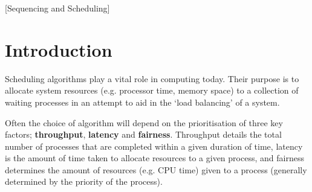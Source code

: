 \documentclass{acm_proc_article-sp}
\begin{document}

\maketitle
\begin{abstract}
Process scheduling algorithms form a core part of modern computer systems nowadays, by enabling the ``illusion" of multi-tasking to take place within operating systems. Choosing a suitable algorithm can be crucial to the efficiency and underlying speed of a system. The purpose of this investigation is to compare and contrast a selection of process scheduling algorithms to determine the differences in performance when presented with various collections of jobs. These algorithms will be implemented into an existing simulator written in the Java programming language, and tested using a variety of different processes and priorities. 

Through extensive experimental testing, it was discovered that the use of preemptive scheduling algorithms can lead to a greater level of throughput, while minimising latency. In addition, non-deterministic algorithms can provide better performance for jobs that require a high level of I/O operations that in turn cause the halting of such jobs on the CPU. 

\end{abstract}

[Sequencing and Scheduling]


\section{Introduction}
Scheduling algorithms play a vital role in computing today. Their purpose is to allocate system resources (e.g. processor time, memory space) to a collection of waiting processes in an attempt to aid in the `load balancing' of a system.

Often the choice of algorithm will depend on the prioritisation of three key factors; \textbf{throughput}, \textbf{latency} and \textbf{fairness}. Throughput details the total number of processes that are completed within a given duration of time, latency is the amount of time taken to allocate resources to a given process, and fairness determines the amount of resources (e.g. CPU time) given to a process (generally determined by the priority of the process).
\end{document}
